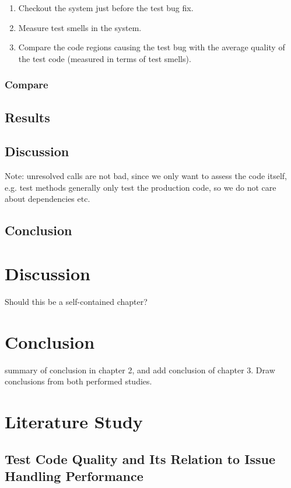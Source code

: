 \documentclass{uvamscse}
\begin{document}
\begin{enumerate}
	\item Checkout the system just before the test bug fix.
	\item Measure test smells in the system.
	\item Compare the code regions causing the test bug with the average quality of the test code (measured in terms of test smells).
\end{enumerate}

\subsection{Compare }

\section{Results}
\label{sec:TS_results}

\section{Discussion}
\label{sec:TS_discussion}

Note: unresolved calls are not bad, since we only want to assess the code itself, e.g. test methods generally only test the production code, so we do not care about dependencies etc.

\section{Conclusion}
\label{sec:TS_conclusion}

\chapter{Discussion}
Should this be a self-contained chapter?

\chapter{Conclusion}
summary of conclusion in chapter 2, and add conclusion of chapter 3. Draw conclusions from both performed studies.


\chapter{Literature Study}

\section{Test Code Quality and Its Relation to Issue Handling Performance}
\end{document}
